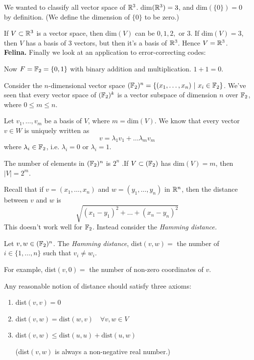 \documentclass[10pt]{scrartcl}
\begin{document}
We wanted to classify 
all vector space of $\mathbb{R}^3$. dim$(\mathbb{R}^3) = 3$, and dim$(\{0\}) = 0$ by definition. (We define the dimension of $\{0\}$ to be zero.)

If $V \subset \mathbb{R}^3$ is a vector space, then dim$(V)$ can be $0,1,2,$ or $3$. If dim$(V) = 3$, then $V$ has a basis of $3$ vectors, but then it's a basis of $\mathbb{R}^3$. Hence $V = \mathbb{R}^3$.\\

\textbf{Felina.} Finally we look at an application to error-correcting codes: 


Now $F = \mathbb{F}_2 = \{0,1\}$ with binary addition and multiplication. $1 + 1 = 0$. 

Consider the $n$-dimensional vector space $(\mathbb{F}_2)^n = \{(x_1,\dots,x_n) ~|~ x_i \in \mathbb{F}_2\}$. We've seen that every vector space of $(\mathbb{F}_2)^k$ is a vector subspace of dimension $n$ over $\mathbb{F}_2$, where $0 \leq m \leq n$. 

Let $v_1,\dots,v_m$ be a basis of $V$, where $m = \mathrm{dim}(V)$. We know that every vector $v \in W$ is uniquely written as 
\[
  v = \lambda_1v_1 + \dots \lambda_mv_m
\]
where $\lambda_i \in \mathbb{F}_2$, i.e. $\lambda_i = 0$ or $\lambda_i = 1$. 

The number of elements in $(\mathbb{F}_2)^n$ is $2^n$ .If $V \subset (\mathbb{F}_2)$ has dim$(V) = m$, then $|V| = 2^m$. 

Recall that if $v = (x_1,\dots,x_n)$ and $w = (y_1,\dots,y_n)$ in $\mathbb{R}^n$, then the distance between $v$ and $w$ is \[\sqrt{(x_1 - y_1)^2 + \dots + (x_n - y_n)^2}\] This doesn't work well for $\mathbb{F}_2$. Instead consider the \emph{Hamming distance.}\\


\begin{definition}
Let $v, w \in (\mathbb{F}_2)^n$. The \emph{Hamming distance}, dist$(v,w) = $ the number of $i \in \{1,\dots,n\}$ such that $v_i \neq w_i$. 	
\end{definition}

For example, dist$(v,0) = $ the number of non-zero coordinates of $v$. 

Any reasonable notion of distance should satisfy three axioms: 
\begin{enumerate}
\item dist$(v,v) = 0$
\item dist$(v,w) = \mathrm{dist}(w,v) \quad \forall v,w \in V$
\item dist$(v,w) \leq \mathrm{dist}(u,u) + \mathrm{dist}(u,w)$

(dist$(v,w)$ is always a non-negative real number.)	
\end{enumerate}
\end{document}
